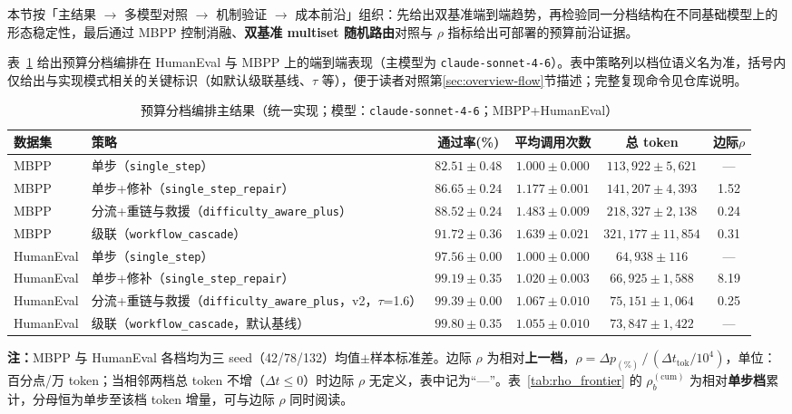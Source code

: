 本节按「主结果 $\rightarrow$ 多模型对照 $\rightarrow$ 机制验证 $\rightarrow$ 成本前沿」组织：先给出双基准端到端趋势，再检验同一分档结构在不同基础模型上的形态稳定性，最后通过 MBPP 控制消融、\textbf{双基准 multiset 随机路由}对照与 $\rho$ 指标给出可部署的预算前沿证据。

表~\ref{tab:main_results} 给出预算分档编排在 HumanEval 与 MBPP 上的端到端表现（主模型为 \texttt{claude-sonnet-4-6}）。表中策略列以档位语义名为准，括号内仅给出与实现模式相关的关键标识（如默认级联基线、$\tau$ 等），便于读者对照第\ref{sec:overview-flow}节描述；完整复现命令见仓库说明。

\begin{table}[htbp]
\centering
\small
\caption{预算分档编排主结果（统一实现；模型：\texttt{claude-sonnet-4-6}；MBPP+HumanEval）}
\label{tab:main_results}
\begin{tabularx}{\textwidth}{@{}p{2.2cm} >{\raggedright\arraybackslash}X c c c c@{}}
\toprule
数据集 & 策略 & 通过率(\%) & 平均调用次数 & 总 token & 边际$\rho$ \\
\midrule
MBPP & 单步（\texttt{single\_step}） & $82.51\pm0.48$ & $1.000\pm0.000$ & $113{,}922\pm5{,}621$ & --- \\
MBPP & 单步+修补（\texttt{single\_step\_repair}） & $86.65\pm0.24$ & $1.177\pm0.001$ & $141{,}207\pm4{,}393$ & 1.52 \\
MBPP & 分流+重链与救援（\texttt{difficulty\_aware\_plus}） & $88.52\pm0.24$ & $1.483\pm0.009$ & $218{,}327\pm2{,}138$ & 0.24 \\
MBPP & 级联（\texttt{workflow\_cascade}） & $91.72\pm0.36$ & $1.639\pm0.021$ & $321{,}177\pm11{,}854$ & 0.31 \\
\midrule
HumanEval & 单步（\texttt{single\_step}） & $97.56\pm0.00$ & $1.000\pm0.000$ & $64{,}938\pm116$ & --- \\
HumanEval & 单步+修补（\texttt{single\_step\_repair}） & $99.19\pm0.35$ & $1.020\pm0.003$ & $66{,}925\pm1{,}588$ & 8.19 \\
HumanEval & 分流+重链与救援（\texttt{difficulty\_aware\_plus}，v2，$\tau$=1.6） & $99.39\pm0.00$ & $1.067\pm0.010$ & $75{,}151\pm1{,}064$ & 0.25 \\
HumanEval & 级联（\texttt{workflow\_cascade}，默认基线） & $99.80\pm0.35$ & $1.055\pm0.010$ & $73{,}847\pm1{,}422$ & --- \\
\bottomrule
\end{tabularx}

\vspace{0.5ex}
{\footnotesize\textbf{注：}MBPP 与 HumanEval 各档均为三 seed（42/78/132）均值$\pm$样本标准差。边际 $\rho$ 为相对\textbf{上一档}，$\rho=\Delta p_{\mathrm{(\%)}}\,/\,(\Delta t_{\mathrm{tok}}/10^4)$，单位：百分点/万 token；当相邻两档总 token 不增（$\Delta t\le 0$）时边际 $\rho$ 无定义，表中记为“---”。表~\ref{tab:rho_frontier} 的 $\rho_b^{(\mathrm{cum})}$ 为相对\textbf{单步档}累计，分母恒为单步至该档 token 增量，可与边际 $\rho$ 同时阅读。}
\end{table}

